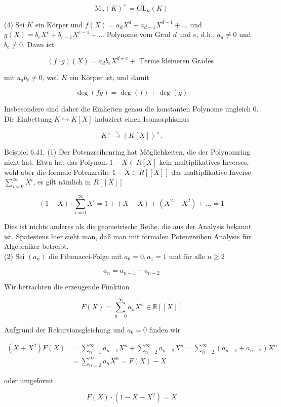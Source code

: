 \documentclass[10pt, letterpaper]{article}
\begin{document}
$$
\mathrm{M}_{n}(K)^{\times}=\mathrm{GL}_{n}(K)
$$

(4) Sei $K$ ein Körper und $f(X)=a_{d} X^{d}+a_{d-1} X^{d-1}+\ldots$ und $g(X)=b_{e} X^{e}+b_{e-1} X^{e-1}+\ldots$ Polynome vom Grad $d$ und $e$, d.h., $a_{d} \neq 0$ und $b_{e} \neq 0$. Dann ist

$$
(f \cdot g)(X)=a_{d} b_{e} X^{d+e}+\text { Terme kleineren Grades }
$$

mit $a_{d} b_{e} \neq 0$, weil $K$ ein Körper ist, und damit

$$
\operatorname{deg}(f g)=\operatorname{deg}(f)+\operatorname{deg}(g)
$$

Insbesondere sind daher die Einheiten genau die konstanten Polynome ungleich 0. Die Einbettung $K \hookrightarrow K[X]$ induziert einen Isomorphismus

$$
K^{\times} \xrightarrow{\sim}(K[X])^{\times} .
$$

Beispiel 6.41. (1) Der Potenzreihenring hat Möglichkeiten, die der Polynomring nicht hat. Etwa hat das Polynom $1-X \in R[X]$ kein multiplikatives Inverses, wohl aber die formale Potenzreihe $1-X \in R[[X]]$ das multiplikative Inverse $\sum_{i=0}^{\infty} X^{i}$, es gilt nämlich in $R[[X]]$

$$
(1-X) \cdot \sum_{i=0}^{\infty} X^{i}=1+(X-X)+\left(X^{2}-X^{2}\right)+\ldots=1
$$

Dies ist nichts anderes als die geometrische Reihe, die aus der Analysis bekannt ist. Spätestens hier sieht man, daß man mit formalen Potenzreihen Analysis für Algebraiker betreibt.\\
(2) Sei $\left(a_{n}\right)$ die Fibonacci-Folge mit $a_{0}=0, a_{1}=1$ und für alle $n \geq 2$

$$
a_{n}=a_{n-1}+a_{n-2}
$$

Wir betrachten die erzeugende Funktion

$$
F(X)=\sum_{n=0}^{\infty} a_{n} X^{n} \in \mathbb{R}[[X]]
$$

Aufgrund der Rekursionsgleichung und $a_{0}=0$ finden wir

$$
\begin{aligned}
\left(X+X^{2}\right) F(X) & =\sum_{n=1}^{\infty} a_{n-1} X^{n}+\sum_{n=2}^{\infty} a_{n-2} X^{n}=\sum_{n=2}^{\infty}\left(a_{n-1}+a_{n-2}\right) X^{n} \\
& =\sum_{n=2}^{\infty} a_{n} X^{n}=F(X)-X
\end{aligned}
$$

oder umgeformt

$$
F(X) \cdot\left(1-X-X^{2}\right)=X
$$
\end{document}
